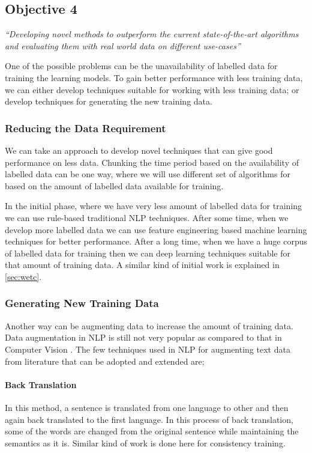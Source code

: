 \subsection{Objective 4}
\textit{``Developing novel methods to outperform the current state-of-the-art algorithms and evaluating them with real world data on different use-cases''}

\vspace{12pt}

One of the possible problems can be the unavailability of labelled data for training the learning models. To gain better performance with less training data, we can either develop techniques suitable for working with less training data; or develop techniques for generating the new training data.

\subsubsection{Reducing the Data Requirement}
We can take an approach to develop novel techniques that can give good performance on less data. Chunking the time period based on the availability of labelled data can be one way, where we will use different set of algorithms for based on the amount of labelled data available for training.

In the initial phase, where we have very less amount of labelled data for training we can use rule-based traditional NLP techniques. After some time, when we develop more labelled data we can use feature engineering based machine learning techniques for better performance. After a long time, when we have a huge corpus of labelled data for training then we can deep learning techniques suitable for that amount of training data. A similar kind of initial work is explained in \cref{sec:wetc}.

\subsubsection{Generating New Training Data}
Another way can be augmenting data to increase the amount of training data. Data augmentation in NLP is still not very popular as compared to that in Computer Vision \cite{guo2018long}. The few techniques used in NLP for augmenting text data from literature that can be adopted and extended are;

\paragraph{Back Translation} 
In this method, a sentence is translated from one language to other and then again back translated to the first language. In this process of back translation, some of the words are changed from the original sentence while maintaining the semantics as it is. Similar kind of work is done here \cite{Xie2019} for consistency training.

